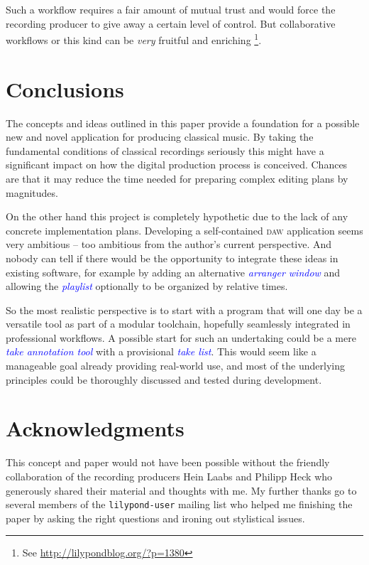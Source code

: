 \documentclass[11pt,a4paper]{article}
\newcommand*{\term}[1]{\textcolor{blue}{\emph{#1}}}
\begin{document}
Such a workflow requires a fair amount of mutual trust and would force the
recording producer to give away a certain level of control.
But collaborative workflows or this kind can be \emph{very} fruitful and
enriching%
\footnote{See \url{http://lilypondblog.org/?p=1380}}.


\section{Conclusions}

The concepts and ideas outlined in this paper provide a foundation for a
possible new and novel application for producing classical music. By taking
the fundamental conditions of classical recordings seriously this might have
a significant impact on how the digital production process is conceived.
Chances are that it may reduce the time needed for preparing complex editing
plans by magnitudes.

On the other hand this project is completely hypothetic due to the lack of
any concrete implementation plans. Developing a self-contained \textsc{daw}
application seems very ambitious -- too ambitious from the author's current
perspective. And nobody can tell if there would be the opportunity to 
integrate these ideas in existing software, for example by adding an alternative
\term{arranger window} and allowing the \term{playlist} optionally to be
organized by relative times.

So the most realistic perspective is to start with a program that will one day
be a versatile tool as part of a modular toolchain, hopefully seamlessly
integrated in professional workflows. A possible start for such an undertaking
could be a mere \term{take annotation tool} with a provisional \term{take list}.
This would seem like a manageable goal already providing real-world use, and
most of the underlying principles could be thoroughly discussed and tested
during development. 

\section{Acknowledgments}

This concept and paper would not have been possible without the friendly collaboration
of the recording producers Hein Laabs and Philipp Heck who generously shared their
material and thoughts with me. My further thanks go to several members of the
\texttt{lilypond-user} mailing list who helped me finishing the paper by asking
the right questions and ironing out stylistical issues. 
\end{document}
